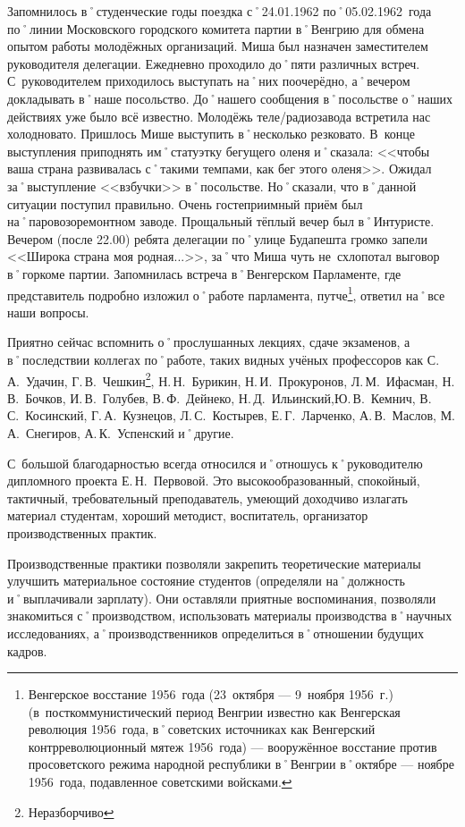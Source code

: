 Запомнилось в˚студенческие годы поездка с˚24.01.1962 по˚05.02.1962~года по˚линии Московского городского комитета партии в˚Венгрию для обмена опытом работы молодёжных организаций. Миша был назначен заместителем руководителя делегации. Ежедневно проходило до˚пяти различных встреч. С~руководителем приходилось выступать на˚них поочерёдно, а˚вечером докладывать в˚наше посольство. До˚нашего сообщения в˚посольстве о˚наших действиях уже было всё известно. Молодёжь теле\-/радиозавода встретила нас холодновато. Пришлось Мише выступить в˚несколько резковато. В~конце выступления приподнять им˚статуэтку бегущего оленя и˚сказала: <<чтобы ваша страна развивалась с˚такими темпами, как бег этого оленя>>. Ожидал за˚выступление <<взбучки>> в˚посольстве. Но˚сказали, что в˚данной ситуации поступил правильно. Очень гостеприимный приём был на˚паровозоремонтном заводе. Прощальный тёплый вечер был в˚Интуристе. Вечером (после 22.00) ребята делегации по˚улице Будапешта громко запели <<Широка страна моя родная...>>, за˚что Миша чуть не~схлопотал выговор в˚горкоме партии. Запомнилась встреча в˚Венгерском Парламенте, где представитель подробно изложил о˚работе парламента, путче\footnote{Венгерское восстание 1956~года (23~октября — 9~ноября 1956~г.) (в~посткоммунистический период Венгрии известно как Венгерская революция 1956~года, в˚советских источниках как Венгерский контрреволюционный мятеж 1956~года) — вооружённое восстание против просоветского режима народной республики в˚Венгрии в˚октябре — ноябре 1956~года, подавленное советскими войсками.}, ответил на˚все наши вопросы.

Приятно сейчас вспомнить о˚прослушанных лекциях, сдаче экзаменов, а в˚последствии коллегах по˚работе, таких видных учёных профессоров как С.\,А.~Удачин, Г.\,В.~Чешкин\footnote{Неразборчиво}, Н.\,Н.~Бурикин, Н.\,И.~Прокуронов, Л.\,М.~Ифасман, Н.\,В.~Бочков, И.\,В.~Голубев, В.\,Ф.~Дейнеко, Н.\,Д.~Ильинский,Ю.\,В.~Кемнич, В.\,С.~Косинский, Г.\,А.~Кузнецов, Л.\,С.~Костырев, Е.\,Г.~Ларченко, А.\,В.~Маслов, М.\,А.~Снегиров, А.\,К.~Успенский и˚другие.

С~большой благодарностью всегда относился и˚отношусь к˚руководителю дипломного проекта Е.\,Н.~Первовой. Это высокообразованный, спокойный, тактичный, требовательный преподаватель, умеющий доходчиво излагать материал студентам, хороший методист, воспитатель, организатор производственных практик.

Производственные практики позволяли закрепить теоретические материалы улучшить материальное состояние студентов (определяли на˚должность и˚выплачивали зарплату). Они оставляли приятные воспоминания, позволяли знакомиться с˚производством, использовать материалы производства в˚научных исследованиях, а˚производственников определиться в˚отношении будущих кадров.

